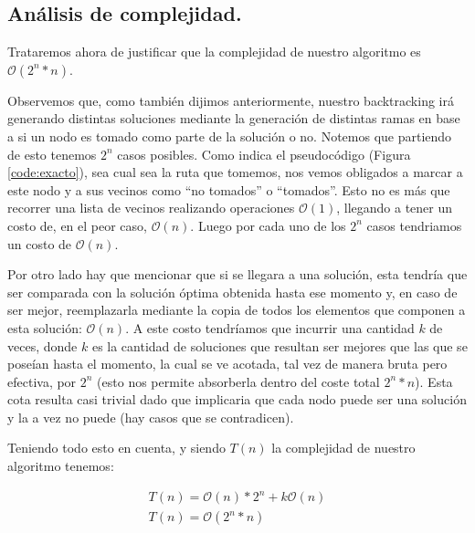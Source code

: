 \vspace*{0.6cm}


\subsection{Análisis de complejidad.}

\vspace*{0.3cm}

Trataremos ahora de justificar que la complejidad de nuestro algoritmo es $\mathcal{O}(2^n * n)$.

Observemos que, como también dijimos anteriormente, nuestro backtracking irá generando distintas soluciones mediante la generación de distintas ramas en base a si un nodo es tomado como parte de la solución o no. Notemos que partiendo de esto tenemos $2^n$ casos posibles. Como indica el pseudocódigo (Figura \ref{code:exacto}), sea cual sea la ruta que tomemos, nos vemos obligados a marcar a este nodo y a sus vecinos como ``no tomados'' o ``tomados''. Esto no es más que recorrer una lista de vecinos realizando operaciones $\mathcal{O}(1)$, llegando a tener un costo de, en el peor caso, $\mathcal{O}(n)$. Luego por cada uno de los $2^n$ casos tendriamos un costo de $\mathcal{O}(n)$.

Por otro lado hay que mencionar que si se llegara a una solución, esta tendría que ser comparada con la solución óptima obtenida hasta ese momento y, en caso de ser mejor, reemplazarla mediante la copia de todos los elementos que componen a esta solución: $\mathcal{O}(n)$. A este costo tendríamos que incurrir una cantidad $k$ de veces, donde $k$ es la cantidad de soluciones que resultan ser mejores que las que se poseían hasta el momento, la cual se ve acotada, tal vez de manera bruta pero efectiva, por $2^n$ (esto nos permite absorberla dentro del coste total $2^n*n$). Esta cota resulta casi trivial dado que implicaria que cada nodo puede ser una solución y la a vez no puede (hay casos que se contradicen).

Teniendo todo esto en cuenta, y siendo $T(n)$ la complejidad de nuestro algoritmo tenemos:

\begin{equation*}
\begin{array}{l}
T(n) = \mathcal{O}(n)*2^n + k\mathcal{O}(n)\\
T(n) = \mathcal{O}(2^n *n)
\end{array}
\end{equation*}





